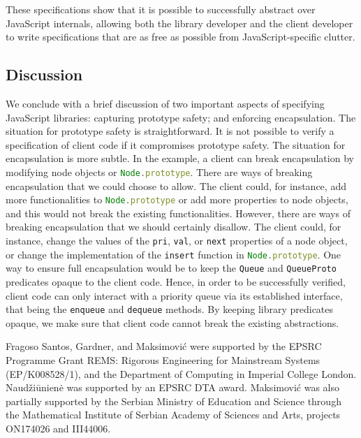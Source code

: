 \documentclass{llncs}
\def\jsinline{\lstinline[language=JavaScript, basicstyle=\small]}
\begin{document}
These specifications show that it is possible to successfully abstract over JavaScript internals, 
allowing both the library developer and the client developer to write specifications that are as free
as possible from  JavaScript-specific clutter.

\subsection{Discussion}
We conclude with a brief discussion of  two important aspects of
specifying JavaScript libraries: capturing prototype safety; and
enforcing encapsulation. The situation for prototype safety is
straightforward. It is not possible to verify a specification of
client code if it compromises prototype safety. The situation for
encapsulation is more subtle. 
In the example, a client can break encapsulation by modifying node
objects or \jsinline|Node.prototype|. 
There are ways of breaking encapsulation that we {could choose to allow}.
The client could, for instance, add more functionalities to
\jsinline|Node.prototype| or add more properties to node objects, and
this would not break the existing functionalities. However, there are
ways of breaking encapsulation that we should certainly disallow. The client
could, for instance, change the values of the \jsinline|pri|, \jsinline|val|, or
\jsinline|next| properties of a node object, or change {the implementation of} the
\jsinline|insert| function in \jsinline|Node.prototype|. 
One way to ensure full encapsulation would be to keep the \jsinline|Queue| and \jsinline|QueueProto| predicates opaque to the client code. Hence, in order to be successfully verified, client code can only interact with a priority queue via its established interface, that being the \jsinline|enqueue| and \jsinline|dequeue| methods. By keeping library predicates opaque, we make sure that client code cannot break the existing abstractions.

\bigskip
{} Fragoso Santos, Gardner, and Maksimovi\'{c} were supported by the EPSRC Programme Grant REMS: Rigorous Engineering for Mainstream Systems (EP/K008528/1), and the Department of Computing in Imperial College London. Naud\v{z}i\={u}nien\.{e} was supported by an EPSRC DTA award. Maksimovi\'{c} was also partially supported by the Serbian Ministry of Education and Science through the Mathematical Institute
of Serbian Academy of Sciences and Arts, projects ON174026 and III44006. 

%





\end{document}
